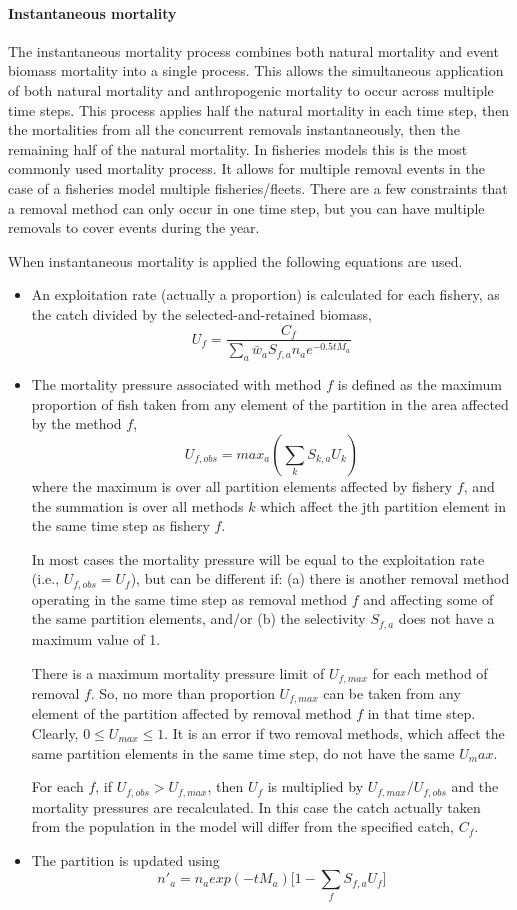 \paragraph{Instantaneous mortality}

The instantaneous mortality process combines both natural mortality and event biomass mortality into a single process. This allows the simultaneous application of both natural mortality and anthropogenic mortality to occur across multiple time steps. This process applies half the natural mortality in each time step, then the mortalities from all the concurrent removals instantaneously, then the remaining half of the natural mortality. In fisheries models this is the most commonly used mortality process. It allows for multiple removal events in the case of a fisheries model multiple fisheries/fleets. There are a few constraints that a removal method can only occur in one time step, but you can have multiple removals to cover events during the year.

When instantaneous mortality is applied the following equations are used.

\begin{itemize}
	\item An exploitation rate (actually a proportion) is calculated for each fishery, as the catch divided by the selected-and-retained biomass,
	$$ U_f = \frac{C_f}{\sum_a \bar{w}_aS_{f,a}n_a e^{-0.5tM_a}}$$
	\item The mortality pressure associated with method $f$ is defined as the maximum proportion of fish taken from any element of the partition in the area affected by the method $f$,
	$$ U_{f,obs} = max_a(\sum_k S_{k,a}U_k) $$
	where the maximum is over all partition elements affected by fishery $f$, and the summation is over all methods $k$ which affect the jth partition element in the same time step as fishery $f$.
	
In most cases the mortality pressure will be equal to the exploitation rate (i.e., $U_{f,obs} = U_f$), but can be different if: (a) there is another removal method operating in the same time step as removal method $f$ and affecting some of the same partition elements, and/or (b) the selectivity $S_{f,a}$ does not have a maximum value of 1.
	
There is a maximum mortality pressure limit of $U_{f,max}$ for each method of removal $f$. So, no more than proportion $U_{f,max}$ can be taken from any element of the partition affected by removal method $f$ in that time step. Clearly, $0 \leq U_{max} \leq 1$. It is an error if two removal methods, which affect the same partition elements in the same time step, do not have the same $U_max$.

For each $f$, if $U_{f,obs} > U_{f,max}$, then $U_f$ is multiplied by $U_{f,max}/U_{f,obs}$ and the mortality pressures are recalculated. In this case the catch actually taken from the population in the model will differ from the specified catch, $C_f$.
	
\item The partition is updated using
	$$ n'_a = n_a exp(-tM_a)\big[1 - \sum_f S_{f,a} U_f \big] $$ 
\end{itemize}

